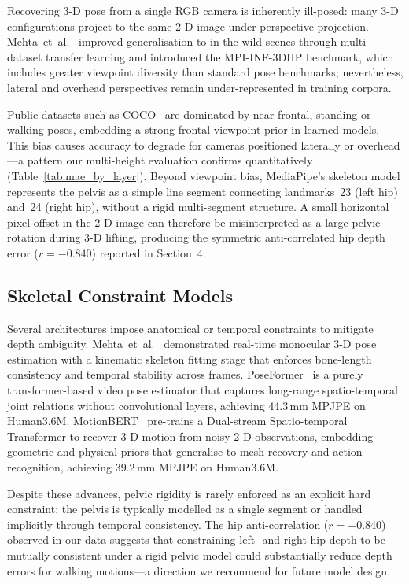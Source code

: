 \documentclass[twocolumn]{article}
\begin{document}
Recovering 3-D pose from a single RGB camera is inherently ill-posed: many
3-D configurations project to the same 2-D image under perspective
projection. Mehta~et~al.~\cite{mehta2017} improved generalisation to
in-the-wild scenes through multi-dataset transfer learning and introduced the
MPI-INF-3DHP benchmark, which includes greater viewpoint diversity than
standard pose benchmarks; nevertheless, lateral and overhead perspectives
remain under-represented in training corpora.

Public datasets such as COCO~\cite{coco} are dominated by near-frontal,
standing or walking poses, embedding a strong frontal viewpoint prior in
learned models. This bias causes accuracy to
degrade for cameras positioned laterally or overhead---a pattern our
multi-height evaluation confirms quantitatively (Table~\ref{tab:mae_by_layer}).
Beyond viewpoint bias, MediaPipe's skeleton model represents the pelvis as a
simple line segment connecting landmarks~23 (left hip) and~24 (right hip),
without a rigid multi-segment structure. A small horizontal pixel offset in
the 2-D image can therefore be misinterpreted as a large pelvic rotation
during 3-D lifting, producing the symmetric anti-correlated hip depth error
($r=-0.840$) reported in Section~4.

\subsection{Skeletal Constraint Models}

Several architectures impose anatomical or temporal constraints to mitigate
depth ambiguity. Mehta~et~al.~\cite{vnect} demonstrated real-time monocular
3-D pose estimation with a kinematic skeleton fitting stage that enforces
bone-length consistency and temporal stability across frames.
PoseFormer~\cite{poseformer} is a purely transformer-based video pose
estimator that captures long-range spatio-temporal joint relations without
convolutional layers, achieving 44.3\,mm MPJPE on Human3.6M.
MotionBERT~\cite{motionbert} pre-trains a Dual-stream Spatio-temporal
Transformer to recover 3-D motion from noisy 2-D observations, embedding
geometric and physical priors that generalise to mesh recovery and action
recognition, achieving 39.2\,mm MPJPE on Human3.6M.

Despite these advances, pelvic rigidity is rarely enforced as an explicit
hard constraint: the pelvis is typically modelled as a single segment or
handled implicitly through temporal consistency. The hip anti-correlation
($r=-0.840$) observed in our data suggests that constraining left- and
right-hip depth to be mutually consistent under a rigid pelvic model could
substantially reduce depth errors for walking motions---a direction we
recommend for future model design.
\end{document}
